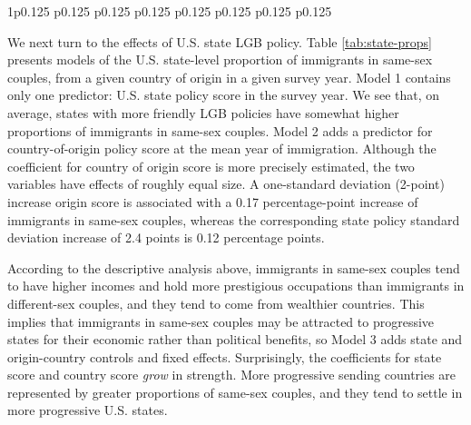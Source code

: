 \documentclass[
  12pt,
]{article}
\begin{document}
\begin{table}[ht]
\begin{centerbox}
\begin{threeparttable}
\begin{tabularx}{1\textwidth}{p{} p{} p{} p{} p{} p{} p{} p{}}
 \tabularnewline[-0.5pt]


\hhline{}
\end{tabularx}
\end{threeparttable}\par\end{centerbox}

\end{table}
 

We next turn to the effects of U.S. state LGB policy. Table \ref{tab:state-props} presents models of the U.S. state-level proportion of immigrants in same-sex couples, from a given country of origin in a given survey year. Model 1 contains only one predictor: U.S. state policy score in the survey year. We see that, on average, states with more friendly LGB policies have somewhat higher proportions of immigrants in same-sex couples. Model 2 adds a predictor for country-of-origin policy score at the mean year of immigration. Although the coefficient for country of origin score is more precisely estimated, the two variables have effects of roughly equal size. A one-standard deviation (2-point) increase origin score is associated with a 0.17 percentage-point increase of immigrants in same-sex couples, whereas the corresponding state policy standard deviation increase of 2.4 points is 0.12 percentage points.

According to the descriptive analysis above, immigrants in same-sex couples tend to have higher incomes and hold more prestigious occupations than immigrants in different-sex couples, and they tend to come from wealthier countries. This implies that immigrants in same-sex couples may be attracted to progressive states for their economic rather than political benefits, so Model 3 adds state and origin-country controls and fixed effects. Surprisingly, the coefficients for state score and country score \emph{grow} in strength. More progressive sending countries are represented by greater proportions of same-sex couples, and they tend to settle in more progressive U.S. states.
\end{document}
